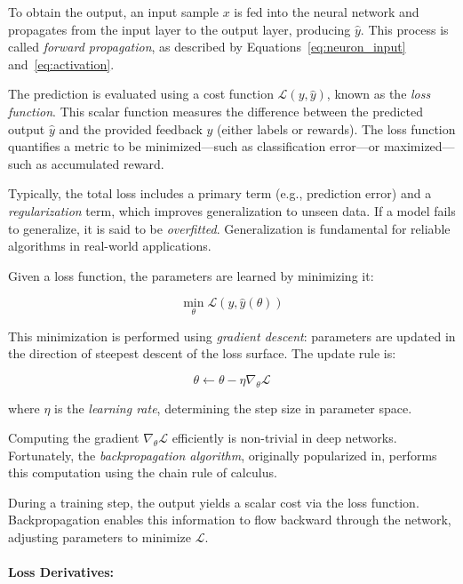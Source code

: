 \documentclass[a4paper,oneside]{book}
\theoremstyle{definition}
\begin{document}
To obtain the output, an input sample \( x \) is fed into the neural network and propagates from the input layer to the output layer, producing \( \hat{y} \). This process is called \textit{forward propagation}, as described by Equations~\eqref{eq:neuron_input} and~\eqref{eq:activation}.

The prediction is evaluated using a cost function \( \mathcal{L}(y, \hat{y}) \), known as the \textit{loss function}. This scalar function measures the difference between the predicted output \( \hat{y} \) and the provided feedback \( y \) (either labels or rewards). The loss function quantifies a metric to be minimized—such as classification error—or maximized—such as accumulated reward.

Typically, the total loss includes a primary term (e.g., prediction error) and a \textit{regularization} term, which improves generalization to unseen data. If a model fails to generalize, it is said to be \textit{overfitted}. Generalization is fundamental for reliable algorithms in real-world applications.

Given a loss function, the parameters are learned by minimizing it:

\begin{equation}
\min_{\theta} \mathcal{L}(y, \hat{y}(\theta))
\label{eq:loss_min}
\end{equation}

This minimization is performed using \textit{gradient descent}: parameters are updated in the direction of steepest descent of the loss surface. The update rule is:

\begin{equation}
\theta \leftarrow \theta - \eta \nabla_\theta \mathcal{L}
\label{eq:gradient_descent}
\end{equation}

where \( \eta \) is the \textit{learning rate}, determining the step size in parameter space.

Computing the gradient \( \nabla_\theta \mathcal{L} \) efficiently is non-trivial in deep networks. Fortunately, the \textit{backpropagation algorithm}, originally popularized in, performs this computation using the chain rule of calculus.

During a training step, the output yields a scalar cost via the loss function. Backpropagation enables this information to flow backward through the network, adjusting parameters to minimize \( \mathcal{L} \).

\paragraph{Loss Derivatives:}
\end{document}
